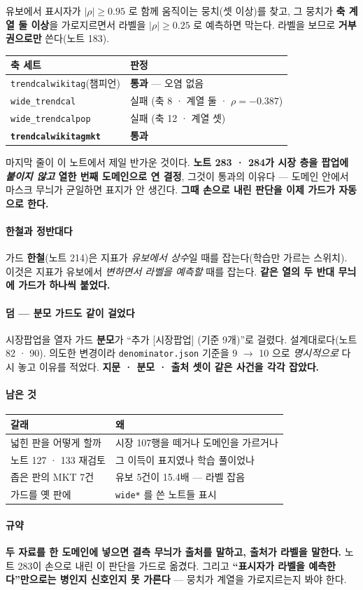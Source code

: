\documentclass[10pt]{article}
\begin{document}
유보에서 표시자가 $|\rho|{\ge}0.95$ 로 함께 움직이는 뭉치(셋 이상)를 찾고,
그 뭉치가 \textbf{축 계열 둘 이상}을 가로지르면서 라벨을 $|\rho|{\ge}0.25$ 로
예측하면 막는다. 라벨을 보므로 \textbf{거부권으로만} 쓴다(노트 183).

\begin{center}\small
\begin{tabular}{ll}
\hline
축 세트 & 판정 \\
\hline
\texttt{trendcalwikitag}(챔피언) & \textbf{통과} --- 오염 없음 \\
\texttt{wide\_trendcal} & 실패 (축 8 · 계열 둘 · $\rho{=}{-}0.387$) \\
\texttt{wide\_trendcalpop} & 실패 (축 12 · 계열 셋) \\
\textbf{\texttt{trendcalwikitagmkt}} & \textbf{통과} \\
\hline
\end{tabular}
\end{center}

마지막 줄이 이 노트에서 제일 반가운 것이다. \textbf{노트 283 · 284가 시장
층을 팝업에 \emph{붙이지 않고} 열한 번째 도메인으로 연 결정}, 그것이 통과의
이유다 --- 도메인 안에서 마스크 무늬가 균일하면 표지가 안 생긴다. \textbf{그때
손으로 내린 판단을 이제 가드가 자동으로 한다.}

\paragraph{한철과 정반대다} 가드 \textbf{한철}(노트 214)은 지표가 \emph{유보에서
상수}일 때를 잡는다(학습만 가르는 스위치). 이것은 지표가 유보에서 \emph{변하면서
라벨을 예측할} 때를 잡는다. \textbf{같은 열의 두 반대 무늬에 가드가 하나씩
붙었다.}

\paragraph{덤 --- 분모 가드도 같이 걸었다} 시장팝업을 열자 가드 \textbf{분모}가
``추가 [시장팝업] (기준 9개)''로 걸렸다. 설계대로다(노트 82 · 90). 의도한
변경이라 \texttt{denominator.json} 기준을 9 $\to$ 10 으로 \emph{명시적으로}
다시 놓고 이유를 적었다. \textbf{지문 · 분모 · 출처 셋이 같은 사건을 각각
잡았다.}

\paragraph{남은 것}
\begin{center}\small
\begin{tabular}{ll}
\hline
갈래 & 왜 \\
\hline
넓힌 판을 어떻게 할까 & 시장 107행을 떼거나 도메인을 가르거나 \\
노트 127 · 133 재검토 & 그 이득이 표지였나 학습 풀이었나 \\
좁은 판의 MKT 7건 & 유보 5건이 15.4배 --- 라벨 잡음 \\
가드를 옛 판에 & \texttt{wide*} 를 쓴 노트들 표시 \\
\hline
\end{tabular}
\end{center}

\paragraph{규약} \textbf{두 자료를 한 도메인에 넣으면 결측 무늬가 출처를
말하고, 출처가 라벨을 말한다.} 노트 283이 손으로 내린 이 판단을 가드로
옮겼다. 그리고 \textbf{``표시자가 라벨을 예측한다''만으로는 병인지 신호인지
못 가른다} --- 뭉치가 계열을 가로지르는지 봐야 한다.
\end{document}
